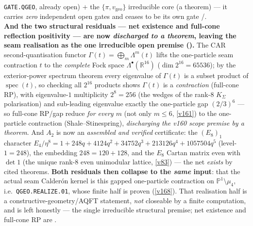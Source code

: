 \documentclass[11pt,a4paper]{article}
\newcommand{\PP}{\mathbb P^1}
\begin{document}
\begin{keybox}
\texttt{GATE.QGEO}, already open) $+$ the $\{\pi,v_{\mathrm{geo}}\}$ irreducible core (a theorem) --- it
carries \emph{zero} independent open gates and ceases to be its own gate \mE/\mO.
\smallskip\\
\noindent\textbf{And the two structural residuals --- net existence and full-cone reflection positivity ---
are now \emph{discharged to a theorem}, leaving the seam realisation as the one irreducible open premise
().} The CAR second-quantisation functor
$\Gamma(t){=}\bigoplus_m\Lambda^m(t)$ lifts the one-particle seam contraction $t$ to the \emph{complete}
Fock space $\Lambda^\bullet(\mathbb R^{16})$ ($\dim 2^{16}{=}65536$); by the exterior-power spectrum theorem
every eigenvalue of $\Gamma(t)$ is a subset product of $\operatorname{spec}(t)$, so checking all $2^{16}$
products shows $\Gamma(t)$ is a \emph{contraction} (full-cone RP), with eigenvalue-$1$ multiplicity
$2^8{=}256$ (the wedges of the rank-$8$ $K_\Sigma$ polarisation) and sub-leading eigenvalue exactly the
one-particle gap $(2/3)^6$ --- so full-cone RP/gap reduce \emph{for every $m$} (not only $m\le6$, \vref{v161})
to the one-particle contraction (Shale--Stinespring), \emph{discharging the v160 scope premise by a theorem}.
And $A_2$ is now an \emph{assembled and verified} certificate: the $(E_8)_1$ character
$E_4/\eta^8{=}1{+}248q{+}4124q^2{+}34752q^3{+}213126q^4{+}1057504q^5$ (level-$1{=}248$), the embedding
$248{=}120{+}128$, and the $E_8$ Cartan matrix even with $\det 1$ (the unique rank-$8$ even unimodular
lattice, \vref{v83}) --- the net \emph{exists} by cited theorems. \textbf{Both residuals then collapse to the
\emph{same} input}: that the actual seam Calder\'on kernel is this gapped one-particle contraction on
$\PP\setminus\mu_4$, i.e.\ \texttt{QGEO.REALIZE.01}, whose finite half is proven (\vref{v168}). That
realisation half is a constructive-geometry/AQFT statement, \emph{not} closeable by a finite computation, and
is left honestly \mO --- the single irreducible structural premise; net existence and full-cone RP are \mE.
\end{keybox}
\end{document}
